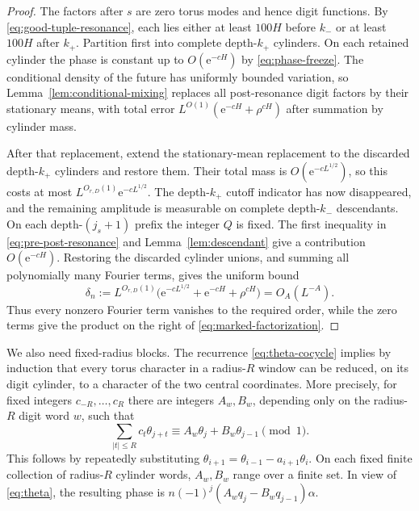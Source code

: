 \documentclass[11pt,a4paper]{amsart}
\theoremstyle{definition}
\theoremstyle{remark}
\newcommand{\e}{\mathrm e}
\begin{document}
\begin{proof}
The factors after $s$ are zero torus modes and hence digit functions.  By
\eqref{eq:good-tuple-resonance}, each lies either at least $100H$ before
$k_-$ or at least $100H$ after $k_+$.  Partition first into complete
depth-$k_+$ cylinders.  On each retained cylinder the phase is constant up to
$O(\e^{-cH})$ by \eqref{eq:phase-freeze}.  The conditional density of the
future has uniformly bounded variation, so
Lemma~\ref{lem:conditional-mixing}
replaces all post-resonance digit factors by their stationary means, with
total error $L^{O(1)}(\e^{-cH}+\rho^{cH})$ after summation by cylinder mass.

After that replacement, extend the stationary-mean replacement to the
discarded depth-$k_+$ cylinders and restore them.  Their total mass is
$O(\e^{-cL^{1/2}})$, so this costs at most
$L^{O_{r,D}(1)}\e^{-cL^{1/2}}$.  The depth-$k_+$ cutoff indicator has now
disappeared, and the remaining amplitude is measurable on complete
depth-$k_-$ descendants.  On each depth-$(j_s+1)$ prefix the integer $Q$ is
fixed.  The first inequality in \eqref{eq:pre-post-resonance} and
Lemma~\ref{lem:descendant} give a contribution $O(\e^{-cH})$.  Restoring the
discarded cylinder unions, and summing all polynomially many Fourier terms,
gives the uniform bound
\begin{equation}\label{eq:delta-n}
 \delta_n:=L^{O_{r,D}(1)}
 \bigl(\e^{-cL^{1/2}}+\e^{-cH}+\rho^{cH}\bigr)=O_A(L^{-A}).
\end{equation}
Thus every nonzero Fourier term vanishes to the required order, while the
zero terms give the product on the right of
\eqref{eq:marked-factorization}.
\end{proof}

We also need fixed-radius blocks.  The recurrence
\eqref{eq:theta-cocycle} implies by induction that every torus character in
a radius-$R$ window can be reduced, on its digit cylinder, to a character of
the two central coordinates.  More precisely, for fixed integers
$c_{-R},\ldots,c_R$ there are integers $A_w,B_w$, depending only on the
radius-$R$ digit word $w$, such that
\begin{equation}\label{eq:block-character-reduction}
 \sum_{|t|\le R}c_t\theta_{j+t}
 \equiv A_w\theta_j+B_w\theta_{j-1}\pmod1.
\end{equation}
This follows by repeatedly substituting
$\theta_{i+1}=\theta_{i-1}-a_{i+1}\theta_i$.  On each fixed finite
collection of radius-$R$ cylinder words, $A_w,B_w$ range over a finite set.
In view of
\eqref{eq:theta}, the resulting phase is
$n(-1)^j(A_wq_j-B_wq_{j-1})\alpha$.
\end{document}
